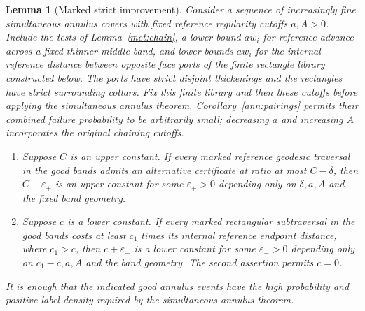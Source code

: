 \documentclass[11pt]{article}
\numberwithin{equation}{section}
\newtheorem{lemma}[theorem]{Lemma}
\theoremstyle{definition}
\theoremstyle{remark}
\newcommand{\1}{\mathbf 1}
\begin{document}
\begin{lemma}[Marked strict improvement]
\label{met:improvement}
Consider a sequence of increasingly fine simultaneous annulus covers
with fixed reference regularity cutoffs $a,A>0$.  Include the tests of
Lemma~\ref{met:chain}, a lower bound $aw_i$ for reference advance
across a fixed thinner middle band, and lower bounds $aw_i$ for the
internal reference distance between opposite face ports of the finite
rectangle library constructed below.  The ports have strict disjoint
thickenings and the rectangles have strict surrounding collars.
Fix this finite library and then these cutoffs before applying the
simultaneous annulus theorem.  Corollary~\ref{ann:pairings} permits
their combined failure probability to be arbitrarily small; decreasing
$a$ and increasing $A$ incorporates the original chaining cutoffs.
\begin{enumerate}
\item Suppose $C$ is an upper constant.  If every marked reference
geodesic traversal in the good bands admits an alternative certificate
at ratio at most $C-\delta$, then $C-\varepsilon_+$ is an upper
constant for some $\varepsilon_+>0$ depending only on
$\delta,a,A$ and the fixed band geometry.
\item Suppose $c$ is a lower constant.  If every marked rectangular
subtraversal in the good bands costs at least $c_1$ times its internal
reference endpoint distance, where $c_1>c$, then
$c+\varepsilon_-$ is a lower constant for some
$\varepsilon_->0$ depending only on $c_1-c,a,A$ and the band geometry.
The second assertion permits $c=0$.
\end{enumerate}
It is enough that the indicated good annulus events have the high
probability and positive label density required by the simultaneous
annulus theorem.
\end{lemma}
\end{document}
